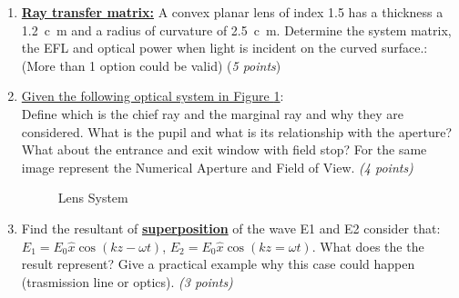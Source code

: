 \documentclass[main.tex]{subfiles}
\begin{document}
\begin{enumerate}

\item \textbf{\underline{Ray transfer matrix:}} A convex planar lens of index 1.5 has a thickness a \SI{1.2}{c\metre} and a radius of curvature of \SI{2.5}{c\metre}. Determine the system matrix, the EFL and optical power when light is incident on the curved surface.: (More than 1 option could be valid) (\textit{5 points}) \\


\item \underline{Given the following optical system in Figure \ref{fig:m_1}}:\\ 
Define which is the chief ray and the marginal ray and why they are considered. What is the pupil and what is its relationship with the aperture? What about the entrance and exit window with field stop? For the same image represent the Numerical Aperture and Field of View. \textit{(4 points)}\\

\begin{figure}
\centering{}
\caption{Lens System}
\label{fig:m_1}
\end{figure}


\item Find the resultant of \textbf{\underline{superposition}} of the wave E1 and E2 consider that: $E_1 = E_0 \hat{x} \cos (kz - \omega t)$, $E_2 = E_0 \hat{x}\cos(kz = \omega t)$. What does the the result represent? Give a practical example why this case could happen (trasmission line or optics). \textit{(3 points)}\\
 


\end{enumerate}
\end{document}
